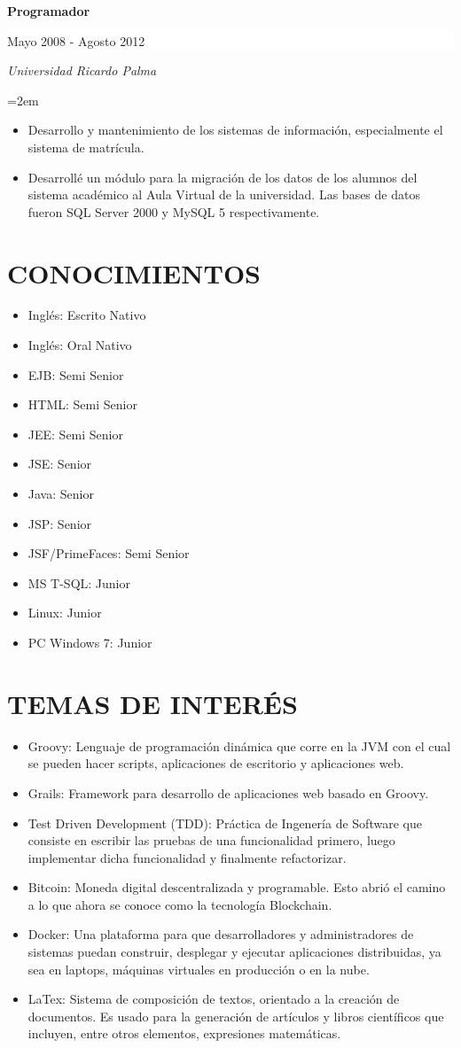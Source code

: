 \documentclass[paper=a4,fontsize=11pt]{scrartcl} %
\newcommand{\sepspace}{\vspace*{1em}}		%
\newcommand{\NewPart}[1]{\section*{\uppercase{#1}}}
\newcommand{\EducationEntry}[4]{
		\noindent \textbf{#1} \hfill      %
		\colorbox{White}{%
			\parbox{5cm}{%
			\hfill\color{Black}#2}} \par  %
		\noindent \textit{#3} \par        %
		\noindent\hangindent=2em\hangafter=0 \small #4 %
		\normalsize \par}
\begin{document}
\EducationEntry{Programador}{Mayo 2008 - Agosto 2012}{Universidad Ricardo Palma}{
\begin{itemize}
\item{Desarrollo y mantenimiento de los sistemas de información, especialmente el sistema de matrícula.}
\item{Desarrollé un módulo para la migración de los datos de los alumnos del sistema académico al Aula Virtual de la universidad. Las bases de datos fueron SQL Server 2000 y MySQL 5 respectivamente.}
\end{itemize}
}
\sepspace

\NewPart{Conocimientos}{}{}{
\begin{itemize}
\item{Inglés: Escrito Nativo}
\item{Inglés: Oral Nativo}
\item{EJB: Semi Senior}
\item{HTML: Semi Senior}
\item{JEE: Semi Senior}
\item{JSE: Senior}
\item{Java: Senior}
\item{JSP:  Senior}
\item{JSF/PrimeFaces: Semi Senior}
\item{MS T-SQL: Junior}
\item{Linux: Junior}
\item{PC Windows 7: Junior}

\end{itemize}
}

\NewPart{Temas de Interés}{}{}{
\begin{itemize}
\item{Groovy: Lenguaje de programación dinámica que corre en la JVM con el cual se pueden hacer scripts, aplicaciones de escritorio y aplicaciones web.}
\item{Grails: Framework para desarrollo de aplicaciones web basado en Groovy.}
\item{Test Driven Development (TDD): Práctica de Ingenería de Software que consiste en escribir las pruebas de una funcionalidad primero, luego implementar dicha funcionalidad y finalmente refactorizar.}
\item{Bitcoin: Moneda digital descentralizada y programable. Esto abrió el camino a lo que ahora se conoce como la tecnología Blockchain.}
\item{Docker: Una plataforma para que desarrolladores y administradores de sistemas puedan construir, desplegar y ejecutar aplicaciones distribuidas, ya sea en laptops, máquinas virtuales en producción o en la nube.}
\item{LaTex: Sistema de composición de textos, orientado a la creación de documentos. Es usado para la generación de artículos y libros científicos que incluyen, entre otros elementos, expresiones matemáticas.}
\end{itemize}
}
\end{document}
